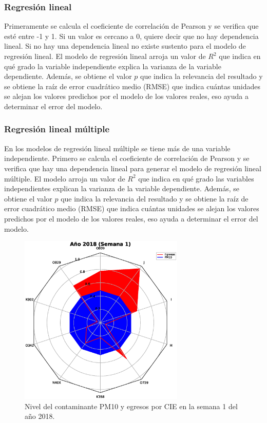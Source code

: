 \documentclass[3p,times]{elsarticle}
\begin{document}
\subsubsection{Regresión lineal}
Primeramente se calcula el coeficiente de correlación de Pearson y se verifica que esté entre -1 y 1. Si un valor es cercano a 0, quiere decir que no hay dependencia lineal. Si no hay una dependencia lineal no existe sustento para el modelo de regresión lineal. El modelo de regresión lineal arroja un valor de $R^2$ que indica en qué grado la variable independiente explica la varianza de la variable dependiente. Además, se obtiene el valor $p$ que indica la relevancia del resultado y se obtiene la raíz de error cuadrático medio (RMSE) que indica cuántas unidades se alejan los valores predichos por el modelo de los valores reales, eso ayuda a determinar el error del modelo.

\subsubsection{Regresión lineal múltiple}
En los modelos de regresión lineal múltiple se tiene más de una variable independiente. Primero se calcula el coeficiente de correlación de Pearson y se verifica que hay una dependencia lineal para generar el modelo de regresión lineal múltiple. El modelo arroja un valor de $R^2$ que indica en qué grado las variables independientes explican la varianza de la variable dependiente. Además, se obtiene el valor $p$ que indica la relevancia del resultado y se obtiene la raíz de error cuadrático medio (RMSE) que indica cuántas unidades se alejan los valores predichos por el modelo de los valores reales, eso ayuda a determinar el error del modelo.

\begin{figure}[h!]
\setcounter{figure}{1} %
\begin{center}
   \includegraphics[trim=0 0 0 74,clip,width=0.7\textwidth]{spiderweb_PM10_2018_1.eps}
   \end{center}
    \caption[Ejemplo de gráfico de radar]{Nivel del contaminante PM10 y egresos por CIE en la semana 1 del año 2018.}
    \label{grafico_de_telaraña}
\end{figure}
\end{document}
